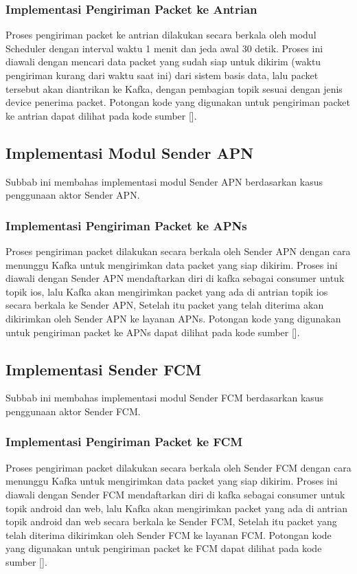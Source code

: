 \subsubsection{Implementasi Pengiriman Packet ke Antrian}
\par Proses pengiriman packet ke antrian dilakukan secara berkala oleh modul Scheduler dengan interval waktu 1 menit
dan jeda awal 30 detik.
Proses ini diawali dengan mencari data packet yang sudah siap untuk dikirim (waktu pengiriman kurang dari waktu saat
ini) dari sistem basis data,
lalu packet tersebut akan diantrikan ke Kafka, dengan pembagian topik sesuai dengan jenis device penerima packet.
Potongan kode yang digunakan untuk pengiriman packet ke antrian dapat dilihat pada kode sumber [].

\subsection{Implementasi Modul Sender APN}
\par Subbab ini membahas implementasi modul Sender APN berdasarkan kasus penggunaan aktor Sender APN.

\subsubsection{Implementasi Pengiriman Packet ke APNs}
\par Proses pengiriman packet dilakukan secara berkala oleh Sender APN dengan cara menunggu Kafka untuk mengirimkan
data packet yang siap dikirim.
Proses ini diawali dengan Sender APN mendaftarkan diri di kafka sebagai consumer untuk topik ios,
lalu Kafka akan mengirimkan packet yang ada di antrian topik ios secara berkala ke Sender APN,
Setelah itu packet yang telah diterima akan dikirimkan oleh Sender APN ke layanan APNs.
Potongan kode yang digunakan untuk pengiriman packet ke APNs dapat dilihat pada kode sumber [].

\subsection{Implementasi Sender FCM}
\par Subbab ini membahas implementasi modul Sender FCM berdasarkan kasus penggunaan aktor Sender FCM.

\subsubsection{Implementasi Pengiriman Packet ke FCM}
\par Proses pengiriman packet dilakukan secara berkala oleh Sender FCM dengan cara menunggu Kafka untuk mengirimkan
data packet yang siap dikirim.
Proses ini diawali dengan Sender FCM mendaftarkan diri di kafka sebagai consumer untuk topik android dan web,
lalu Kafka akan mengirimkan packet yang ada di antrian topik android dan web secara berkala ke Sender FCM,
Setelah itu packet yang telah diterima dikirimkan oleh Sender FCM ke layanan FCM.
Potongan kode yang digunakan untuk pengiriman packet ke FCM dapat dilihat pada kode sumber [].
%
